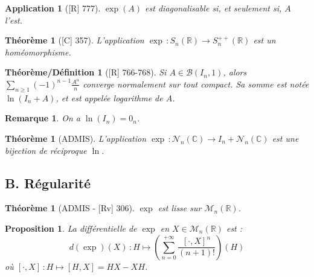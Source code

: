\documentclass[10pt, a4paper, parskip=full, twoside, twocolumn]{report}
\newtheorem{theorem}[definition]{Théorème}
\newtheorem{theorem_def}[definition]{Théorème/Définition}
\newtheorem{proposition}[definition]{Proposition}
\newtheorem{remark}[definition]{Remarque}
\newtheorem{application}[definition]{Application}
\newcommand{\IC}{\mathbb{C}}
\newcommand{\IR}{\mathbb{R}}
\newcommand{\M}{\mathcal{M}}
\begin{document}
\begin{application}[\textnormal{[R] 777}]
	$\exp(A)$ est diagonalisable si, et seulement si, $A$ l'est.
\end{application}


\begin{tcolorbox}[
    breakable, %
    colback=developpement, %
    colframe=gray!0!black, %
    boxrule=0pt, %
    arc=1mm, %
	boxsep=0pt,
	left=0pt, right=0pt, top=0pt, bottom=0pt
]
\begin{theorem}[\textnormal{[C] 357}]
	\label{155dev1}
	L'application $\exp\,\colon S_n(\IR)\to S_n^{++}(\IR)$ est un homéomorphisme.
\end{theorem}
\end{tcolorbox}

\begin{theorem_def}[\textnormal{[R] 766-768}]
	Si $A\in \mathcal{B}(I_n, 1)$, alors $\sum_{n\geq 1}\left(-1\right)^{n-1}\frac{A^n}{n}$
	converge normalement sur tout compact. Sa somme est notée $\ln(I_n+A)$, et est appelée \emph{logarithme de $A$}.
\end{theorem_def}

\begin{remark}
	On a $\ln(I_n) = 0_n$.
\end{remark}

\begin{theorem}[ADMIS]
	L'application $\exp\,\colon \mathcal{N}_n(\IC)\to I_n + \mathcal{N}_n(\IC)$ est une 
	bijection de réciproque $\ln$.
\end{theorem}

\subsection*{B. Régularité}
\begin{theorem}[ADMIS - \textnormal{[Rv] 306}]
	$\exp$ est lisse sur $\M_n(\IR)$.
\end{theorem}

\begin{tcolorbox}[
    breakable, %
    colback=developpement, %
    colframe=gray!0!black, %
    boxrule=0pt, %
    arc=1mm, %
	boxsep=0pt,
	left=0pt, right=0pt, top=0pt, bottom=0pt
]
\begin{proposition}
	\label{155dev2}
	La différentielle de $\exp$ en $X\in\M_n(\IR)$ est :
	$$d(\exp)(X)\,\colon H\mapsto \left(\sum_{n=0}^{+\infty}\frac{[\cdot, X]^n}{(n+1)!}\right)(H)$$
	où $[\cdot, X]\,\colon H \mapsto [H, X] = HX - XH$.
\end{proposition}
\end{tcolorbox}
\end{document}
